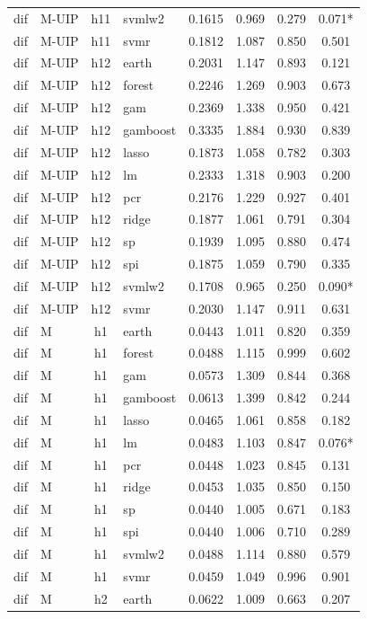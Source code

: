 \begin{ThreePartTable}
\begin{longtable}[t]{llclcccc}
dif & M-UIP & h11 & svmlw2 & 0.1615 & 0.969 & 0.279 & 0.071*\\
dif & M-UIP & h11 & svmr & 0.1812 & 1.087 & 0.850 & 0.501\\
\addlinespace
dif & M-UIP & h12 & earth & 0.2031 & 1.147 & 0.893 & 0.121\\
dif & M-UIP & h12 & forest & 0.2246 & 1.269 & 0.903 & 0.673\\
dif & M-UIP & h12 & gam & 0.2369 & 1.338 & 0.950 & 0.421\\
dif & M-UIP & h12 & gamboost & 0.3335 & 1.884 & 0.930 & 0.839\\
dif & M-UIP & h12 & lasso & 0.1873 & 1.058 & 0.782 & 0.303\\
dif & M-UIP & h12 & lm & 0.2333 & 1.318 & 0.903 & 0.200\\
dif & M-UIP & h12 & pcr & 0.2176 & 1.229 & 0.927 & 0.401\\
dif & M-UIP & h12 & ridge & 0.1877 & 1.061 & 0.791 & 0.304\\
dif & M-UIP & h12 & sp & 0.1939 & 1.095 & 0.880 & 0.474\\
dif & M-UIP & h12 & spi & 0.1875 & 1.059 & 0.790 & 0.335\\
dif & M-UIP & h12 & svmlw2 & 0.1708 & 0.965 & 0.250 & 0.090*\\
dif & M-UIP & h12 & svmr & 0.2030 & 1.147 & 0.911 & 0.631\\
\addlinespace
dif & M & h1 & earth & 0.0443 & 1.011 & 0.820 & 0.359\\
dif & M & h1 & forest & 0.0488 & 1.115 & 0.999 & 0.602\\
dif & M & h1 & gam & 0.0573 & 1.309 & 0.844 & 0.368\\
dif & M & h1 & gamboost & 0.0613 & 1.399 & 0.842 & 0.244\\
dif & M & h1 & lasso & 0.0465 & 1.061 & 0.858 & 0.182\\
dif & M & h1 & lm & 0.0483 & 1.103 & 0.847 & 0.076*\\
dif & M & h1 & pcr & 0.0448 & 1.023 & 0.845 & 0.131\\
dif & M & h1 & ridge & 0.0453 & 1.035 & 0.850 & 0.150\\
dif & M & h1 & sp & 0.0440 & 1.005 & 0.671 & 0.183\\
dif & M & h1 & spi & 0.0440 & 1.006 & 0.710 & 0.289\\
dif & M & h1 & svmlw2 & 0.0488 & 1.114 & 0.880 & 0.579\\
dif & M & h1 & svmr & 0.0459 & 1.049 & 0.996 & 0.901\\
\addlinespace
dif & M & h2 & earth & 0.0622 & 1.009 & 0.663 & 0.207\\

\end{longtable}
\end{ThreePartTable}
